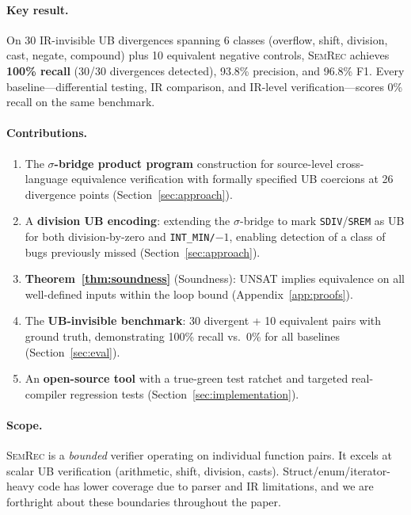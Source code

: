 \documentclass[10pt,a4paper]{article}
\begin{document}
\paragraph{Key result.}
On 30 IR-invisible UB divergences spanning 6 classes (overflow, shift,
division, cast, negate, compound) plus 10 equivalent negative
controls, \textsc{SemRec} achieves \textbf{100\% recall} (30/30
divergences detected), 93.8\% precision, and 96.8\% F1.  Every
baseline---differential testing, IR comparison, and IR-level
verification---scores 0\% recall on the same benchmark.

\paragraph{Contributions.}
\begin{enumerate}[leftmargin=*]
  \item The \textbf{$\sigma$-bridge product program} construction for
    source-level cross-language equivalence verification with formally
    specified UB coercions at 26 divergence points
    (Section~\ref{sec:approach}).
  \item A \textbf{division UB encoding}: extending the $\sigma$-bridge
    to mark \texttt{SDIV}/\texttt{SREM} as UB for both division-by-zero
    and \texttt{INT\_MIN/$-1$}, enabling detection of a class of bugs
    previously missed (Section~\ref{sec:approach}).
  \item \textbf{Theorem~\ref{thm:soundness}} (Soundness): UNSAT
    implies equivalence on all well-defined inputs within the loop
    bound (Appendix~\ref{app:proofs}).
  \item The \textbf{UB-invisible benchmark}: 30 divergent + 10
    equivalent pairs with ground truth, demonstrating 100\% recall
    vs.\ 0\% for all baselines (Section~\ref{sec:eval}).
  \item An \textbf{open-source tool} with a true-green test ratchet and
    targeted real-compiler regression tests
    (Section~\ref{sec:implementation}).
\end{enumerate}

\paragraph{Scope.}
\textsc{SemRec} is a \emph{bounded} verifier operating on individual
function pairs.  It excels at scalar UB verification (arithmetic,
shift, division, casts).  Struct/enum/iterator-heavy code has lower
coverage due to parser and IR limitations, and we are forthright
about these boundaries throughout the paper.
\end{document}
